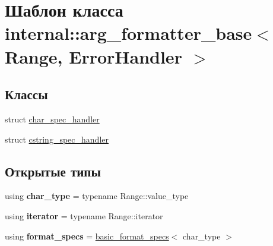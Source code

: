 \hypertarget{classinternal_1_1arg__formatter__base}{}\section{Шаблон класса internal\+:\+:arg\+\_\+formatter\+\_\+base$<$ Range, Error\+Handler $>$}
\label{classinternal_1_1arg__formatter__base}
\subsection*{Классы}
\begin{DoxyCompactItemize}
\item 
struct \hyperlink{structinternal_1_1arg__formatter__base_1_1char__spec__handler}{char\+\_\+spec\+\_\+handler}
\item 
struct \hyperlink{structinternal_1_1arg__formatter__base_1_1cstring__spec__handler}{cstring\+\_\+spec\+\_\+handler}
\end{DoxyCompactItemize}
\subsection*{Открытые типы}
\begin{DoxyCompactItemize}
\item 
\mbox{\label{classinternal_1_1arg__formatter__base_a9f1f0e70d691700e200c8c52304e696e}} 
using {\bfseries char\+\_\+type} = typename Range\+::value\+\_\+type
\item 
\mbox{\label{classinternal_1_1arg__formatter__base_a11232a436aedfe6665c8c04f808045d3}} 
using {\bfseries iterator} = typename Range\+::iterator
\item 
\mbox{\label{classinternal_1_1arg__formatter__base_a615fc4e1c3491b2084620350f6c17e28}} 
using {\bfseries format\+\_\+specs} = \hyperlink{structbasic__format__specs}{basic\+\_\+format\+\_\+specs}$<$ char\+\_\+type $>$
\end{DoxyCompactItemize}
